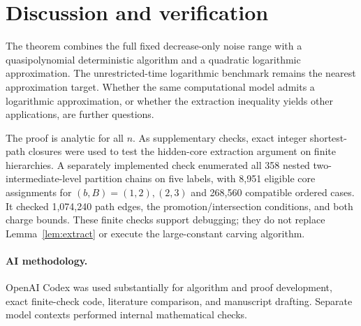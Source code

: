 \documentclass[acmsmall,11pt,nonacm]{acmart}
\theoremstyle{definition}
\begin{document}
\section{Discussion and verification}

The theorem combines the full fixed decrease-only noise range with a
quasipolynomial deterministic algorithm and a quadratic logarithmic
approximation. The unrestricted-time logarithmic benchmark remains the
nearest approximation target. Whether the same computational model admits
a logarithmic approximation, or whether the extraction inequality yields
other applications, are further questions.

The proof is analytic for all $n$. As supplementary checks, exact integer
shortest-path closures were used to test the hidden-core extraction argument
on finite hierarchies. A separately implemented check enumerated all 358
nested two-intermediate-level partition chains on five labels, with 8,951
eligible core assignments for $(b,B)=(1,2),(2,3)$ and 268,560 compatible
ordered cases. It checked 1,074,240 path edges, the promotion/intersection
conditions, and both charge bounds. These finite checks support debugging;
they do not replace Lemma~\ref{lem:extract} or execute the large-constant
carving algorithm.

\paragraph{AI methodology.}
OpenAI Codex was used substantially for algorithm and proof development,
exact finite-check code, literature comparison, and manuscript drafting.
Separate model contexts performed internal mathematical checks.



\end{document}
